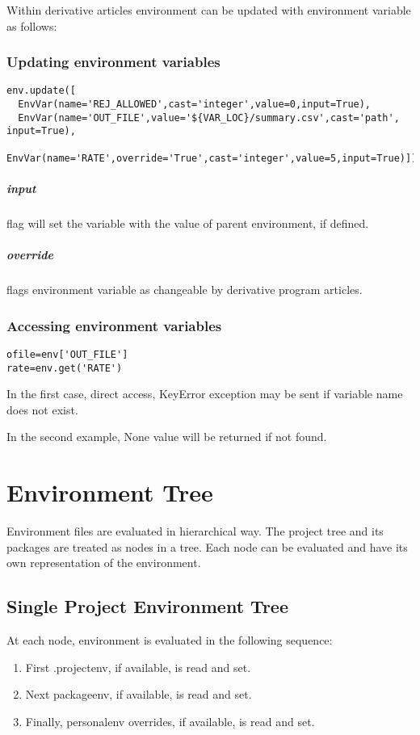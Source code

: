 \documentclass[design.tex]{subfiles}
\begin{document}
Within derivative articles environment can be updated with environment variable as follows:

\subsection{Updating environment variables}  
\begin{lstlisting}
env.update([
  EnvVar(name='REJ_ALLOWED',cast='integer',value=0,input=True),
  EnvVar(name='OUT_FILE',value='${VAR_LOC}/summary.csv',cast='path', input=True),
  EnvVar(name='RATE',override='True',cast='integer',value=5,input=True)])
\end{lstlisting}

\paragraph{input} flag will set the variable with the value of parent environment, if defined.
\paragraph{override} flags environment variable as changeable by derivative program articles.

\subsection{Accessing environment variables} 
\begin{lstlisting}
ofile=env['OUT_FILE']
rate=env.get('RATE')
\end{lstlisting}

In the first case, direct access, KeyError exception may be sent if variable name does not exist.

In the second example, None value will be returned if not found. 

\chapter{Environment Tree} 
Environment files are evaluated in hierarchical way.  The project tree and its packages are treated as nodes in a tree.  Each node can be evaluated and have its own representation of the environment.
 
\section{Single Project Environment Tree}
At each node, environment is evaluated in the following sequence:
\begin{enumerate}
	\item First .projectenv, if available, is read and set.
	\item Next packageenv, if available, is read and set.
	\item Finally, personalenv overrides, if available, is read and set.
\end{enumerate} 
\end{document}
